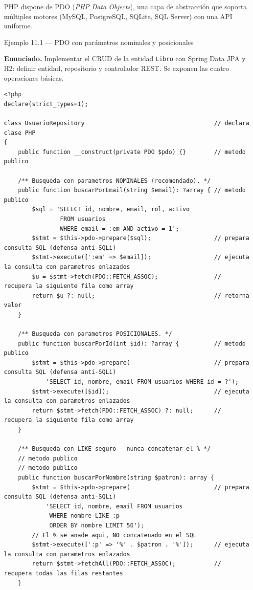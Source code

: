 \documentclass[11pt,a4paper,openany]{book}
\begin{document}
PHP dispone de PDO (\emph{PHP Data Objects}), una capa de
abstracción que soporta múltiples motores (MySQL, PostgreSQL, SQLite,
SQL Server) con una API uniforme.


\begin{cajaejemplo}{Ejemplo 11.1 --- PDO con parámetros nominales y posicionales}

\textbf{Enunciado.} Implementar el CRUD de la entidad \texttt{Libro} con Spring Data JPA y H2: definir entidad, repositorio y controlador REST. Se exponen las cuatro operaciones básicas.

\begin{lstlisting}[style=php,caption={UsuarioRepository.php},label=lst:11.3]
<?php
declare(strict_types=1);

class UsuarioRepository                                     // declara clase PHP
{
    public function __construct(private PDO $pdo) {}        // metodo publico

    /** Busqueda con parametros NOMINALES (recomendado). */
    public function buscarPorEmail(string $email): ?array { // metodo publico
        $sql = 'SELECT id, nombre, email, rol, activo
                FROM usuarios
                WHERE email = :em AND activo = 1';
        $stmt = $this->pdo->prepare($sql);                  // prepara consulta SQL (defensa anti-SQLi)
        $stmt->execute([':em' => $email]);                  // ejecuta la consulta con parametros enlazados
        $u = $stmt->fetch(PDO::FETCH_ASSOC);                // recupera la siguiente fila como array
        return $u ?: null;                                  // retorna valor
    }

    /** Busqueda con parametros POSICIONALES. */
    public function buscarPorId(int $id): ?array {          // metodo publico
        $stmt = $this->pdo->prepare(                        // prepara consulta SQL (defensa anti-SQLi)
            'SELECT id, nombre, email FROM usuarios WHERE id = ?');
        $stmt->execute([$id]);                              // ejecuta la consulta con parametros enlazados
        return $stmt->fetch(PDO::FETCH_ASSOC) ?: null;      // recupera la siguiente fila como array
    }

    /** Busqueda con LIKE seguro - nunca concatenar el % */
    // metodo publico
    // metodo publico
    public function buscarPorNombre(string $patron): array {
        $stmt = $this->pdo->prepare(                        // prepara consulta SQL (defensa anti-SQLi)
            'SELECT id, nombre, email FROM usuarios
             WHERE nombre LIKE :p
             ORDER BY nombre LIMIT 50');
        // El % se anade aqui, NO concatenado en el SQL
        $stmt->execute([':p' => '%' . $patron . '%']);      // ejecuta la consulta con parametros enlazados
        return $stmt->fetchAll(PDO::FETCH_ASSOC);           // recupera todas las filas restantes
    }


\end{lstlisting}
\end{cajaejemplo}
\end{document}
